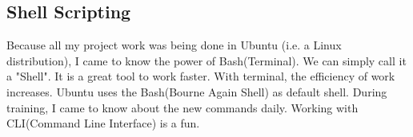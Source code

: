 \subsection{Shell Scripting}
Because all my project work was being done in Ubuntu (i.e. a Linux distribution), I came to know the power of Bash(Terminal). We can simply call it a "Shell". It is a great tool to work faster. With terminal, the efficiency of work increases. Ubuntu uses the Bash(Bourne Again Shell) as default shell. During training, I came to know about the new commands daily. Working with CLI(Command Line Interface) is a fun.